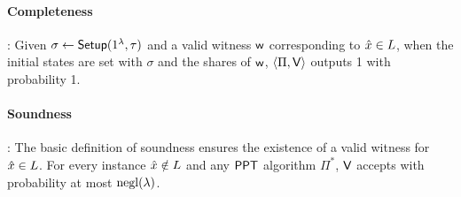 \paragraph{Completeness}: %
Given $\sigma \gets \mathsf{Setup}(1^{\lambda}, \tau)$ and a valid witness $\mathsf{w}$ corresponding to $\hat{x} \in L$, when the initial states are set with $\sigma$ and the shares of $\mathsf{w}$, $\langle \Pi, \mathsf{V} \rangle$ outputs 1 with probability 1.

\paragraph{Soundness}:  The basic definition of soundness ensures the existence of a valid witness for $\hat{x} \in L$. For every instance $\hat{x} \notin L$ and any $\mathsf{PPT}$ algorithm $\Pi^*$, $\mathsf{V}$ accepts with probability at most $\mathrm{negl}({\lambda})$.


